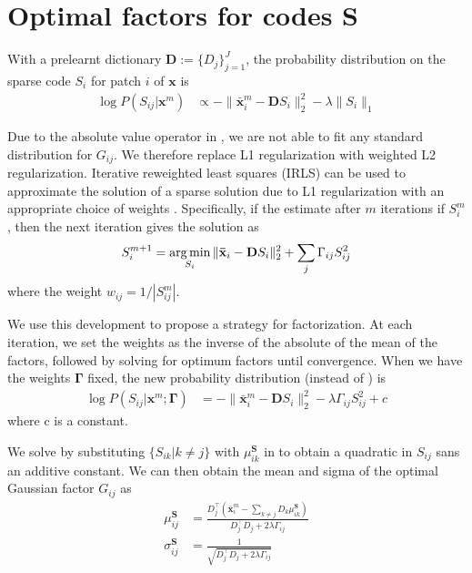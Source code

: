 \chapter{Optimal factors for codes $\mathbf{S}$ }
\label{app:factorParamsS}

With a prelearnt dictionary $\mathbf{D} := \lbrace D_j \rbrace_{j=1}^{J}$, the probability distribution on the sparse code $S_i$ for patch $i$ of $\mathbf{x}$ is
\begin{align}
\log P(S_{ij} | \mathbf{x}^m) &\propto - \| \mathbf{\bar{x}}^m_i - \mathbf{D} S_i \|_2^2 - \lambda \| S_i \|_1 \label{eqn:deriveSFactors}
\end{align}

Due to the absolute value operator in , we are not able to fit any standard distribution for $G_{ij}$. We therefore replace L1 regularization with weighted L2 regularization. Iterative reweighted least squares (IRLS) can be used to approximate the solution of a sparse solution due to L1 regularization with an appropriate choice of weights \cite{chartrand2008iteratively}. Specifically, if the estimate after $m$ iterations if $S^m_i$, then the next iteration gives the solution as
\begin{align}
S^{m+1}_i = \operatorname*{arg\,min}_{S_i} \| \mathbf{\bar{x}}_i - \mathbf{D} S_i \|^2_2 + \sum_{j} \Gamma_{ij} S_{ij}^2
\end{align}
where the weight $w_{ij} = 1/| S^m_{ij} |$.

We use this development to propose a strategy for factorization. At each iteration, we set the weights as the inverse of the absolute of the mean of the factors, followed by solving for optimum factors until convergence. When we have the weights $\mathbf{\Gamma}$ fixed, the new probability distribution (instead of ) is
\begin{align}
\log P(S_{ij} | \mathbf{x}^m; \mathbf{\Gamma}) &= - \| \mathbf{\bar{x}}^m_i - \mathbf{D} S_i \|_2^2 - \lambda \Gamma_{ij} S_{ij}^2 + c \label{eqn:deriveSFactors2}
\end{align}
where c is a constant.

We solve  by substituting $\lbrace S_{ik} | k \neq j \rbrace$ with $\mu^\mathbf{S}_{ik}$ in  to obtain a quadratic in $S_{ij}$ sans an additive constant. We can then obtain the mean and sigma of the optimal Gaussian factor $G_{ij}$ as
\begin{align}
\mu^\mathbf{S}_{ij} &= \frac{ D_j^\intercal \left( \mathbf{\bar{x}}^m_i - \sum_{k \neq j} D_k \mu^\mathbf{S}_{ik} \right) }{ D_j^\intercal D_j + 2 \lambda \Gamma_{ij} } \\
\sigma^\mathbf{S}_{ij} &= \frac{1}{\sqrt{ D_j^\intercal D_j + 2 \lambda \Gamma_{ij} }}
\end{align}